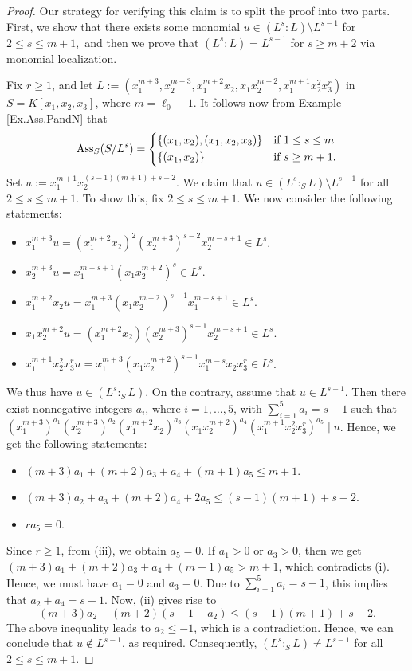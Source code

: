 \documentclass[11pt]{amsart}
\begin{document}
\begin{proof}
 Our strategy for verifying this claim is to split the proof into two parts. 
First, we show that there exists some monomial $u \in (L^s : L) \setminus L^{s-1}$  for  $2 \le s \le m+1,$ and then we prove that
 $(L^s : L) = L^{s-1}$ for  $s \ge m+2$ via monomial localization.

Fix $r\geq 1$, and let  $L:= (x_1^{m+3}, x_2^{m+3}, x_1^{m+2}x_2, x_1x_2^{m+2}, x_1^{m+1}x_2^{2}x_3^r)$ in $S=K[x_1, x_2, x_3]$, where 
$m=\ell_0-1$.  It follows now from Example \ref{Ex.Ass.PandN}  that 
\[
\mathrm{Ass}_S(S/L^s) =
    \begin{dcases}
    \{(x_1,x_2), (x_1,x_2,x_3)\} & \text{if } 1\leq s\leq m\\
\{(x_1,x_2)\}  & \text{if } s\geq m+1. \\
                \end{dcases}
\]
Set $u:=x_1^{m+1}x_2^{(s-1)(m+1)+s-2}$. We claim that $u\in (L^s:_SL)\setminus L^{s-1}$ for all $2\leq s\leq m+1$. To show this, fix $2\leq s\leq m+1$.
 We now  consider the  following statements:
\begin{itemize}
\item[(1)]  $x_1^{m+3}u= (x_1^{m+2}x_2)^2 (x_2^{m+3})^{s-2} x_2^{m-s+1} \in L^s$. 
\item[(2)]  $x_2^{m+3}u= x_1^{m-s+1} (x_1x_2^{m+2})^{s} \in L^s$. 
\item[(3)]  $x_1^{m+2}x_2u=x_1^{m+3} (x_1x_2^{m+2})^{s-1}x_1^{m-s+1}\in L^s.$
\item[(4)]  $x_1x_2^{m+2}u=(x_1^{m+2}x_2)(x_2^{m+3})^{s-1}x_2^{m-s+1}\in L^s$.
\item[(5)]  $x_1^{m+1}x_2^{2}x_3^ru=x_1^{m+3}(x_1x_2^{m+2})^{s-1}x_1^{m-s}x_2x_3^r\in  L^s$.    
\end{itemize}
We thus have   $u\in (L^s:_SL)$. On the contrary, assume  that  $u\in L^{s-1}$. Then there exist nonnegative integers $a_i$, where $i=1, \ldots, 5$, 
 with $\sum_{i=1}^5a_i=s-1$ such that  $(x_1^{m+3})^{a_1} (x_2^{m+3})^{a_2}  (x_1^{m+2}x_2)^{a_3} (x_1x_2^{m+2})^{a_4} 
(x_1^{m+1}x_2^{2}x_3^r)^{a_5} \mid u$. Hence, we get the following statements: 
\begin{itemize}
\item[(i)]  $(m+3)a_1 + (m+2)a_3+ a_4 +(m+1)a_5  \leq m+1$. 
\item[(ii)] $(m+3)a_2 + a_3 + (m+2)a_4 + 2a_5 \leq (s-1)(m+1)+s-2$. 
\item[(iii)] $ra_5=0$. 
\end{itemize}
Since $r\geq 1$, from (iii), we obtain $a_5=0$. If $a_1>0$ or $a_3>0$, then we  get  $(m+3)a_1 + (m+2)a_3+ a_4 +(m+1)a_5 >m+1$, which contradicts (i). Hence, we must have  $a_1=0$ and $a_3=0$. Due to $\sum_{i=1}^5a_i=s-1$, this implies that  $a_2+a_4=s-1$.  Now, (ii) gives rise to  
$$(m+3)a_2  + (m+2)(s-1-a_2)   \leq (s-1)(m+1)+s-2.$$
The above inequality leads to $a_2\leq -1$, which is a contradiction. Hence, we can conclude that  $u\notin L^{s-1}$, as required.
 Consequently, $(L^s:_SL)\neq  L^{s-1}$ for all $2\leq s\leq m+1$.


\end{proof}
\end{document}
